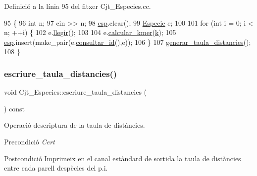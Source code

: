 Definició a la línia 95 del fitxer Cjt\+\_\+\+Especies.\+cc.


\begin{DoxyCode}
95                           \{
96     \textcolor{keywordtype}{int} n;
97     cin >> n;
98     \hyperlink{class_cjt___especies_aa232ab8543b78ea6d8ecaa1e5f9ccef5}{esp}.clear();
99     \hyperlink{class_especie}{Especie} e;
100     
101     \textcolor{keywordflow}{for} (\textcolor{keywordtype}{int} i = 0; i < n; ++i) \{
102         e.\hyperlink{class_especie_a7384add391d2684c4fb6bdf8a535fba3}{llegir}();
103         
104         e.\hyperlink{class_especie_a83fdef791142b0887bfa7f45bd0d5e0e}{calcular\_kmer}(\hyperlink{class_cjt___especies_a4586fb4724b7af4b7f00bb0c0bdd6a17}{k});
105         \hyperlink{class_cjt___especies_aa232ab8543b78ea6d8ecaa1e5f9ccef5}{esp}.insert(make\_pair(e.\hyperlink{class_especie_a1652f05cd2ff7dc71123bf538ecc4476}{consultar\_id}(),e));
106     \}
107     \hyperlink{class_cjt___especies_a9437508ef6176d867e0bb7fbf4ba3106}{generar\_taula\_distancies}();
108 \}
\end{DoxyCode}
\mbox{\label{class_cjt___especies_a67e8351cb59ce549033245fe4c829248}} 
\subsubsection{\texorpdfstring{escriure\+\_\+taula\+\_\+distancies()}{escriure\_taula\_distancies()}}
{\footnotesize\ttfamily void Cjt\+\_\+\+Especies\+::escriure\+\_\+taula\+\_\+distancies (\begin{DoxyParamCaption}{ }\end{DoxyParamCaption}) const}



Operació d\textquotesingle{}escriptura de la taula de distàncies. 

\begin{DoxyPrecond}{Precondició}
{\itshape Cert} 
\end{DoxyPrecond}
\begin{DoxyPostcond}{Postcondició}
Imprimeix en el canal estàndard de sortida la taula de distàncies entre cada parell d\textquotesingle{}espècies del p.\+i. 
\end{DoxyPostcond}


